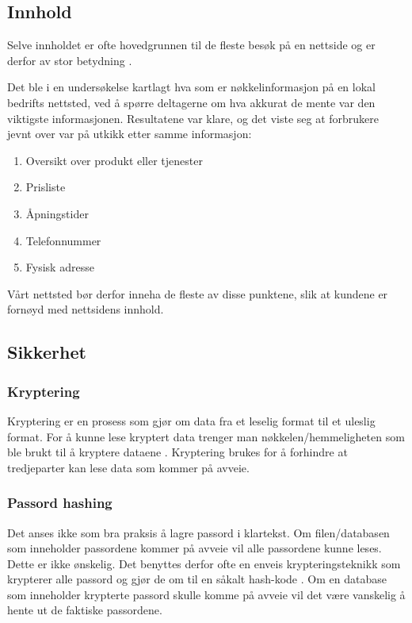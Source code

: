 \subsection{Innhold}
Selve innholdet er ofte hovedgrunnen til de fleste besøk på en nettside og er derfor av stor betydning \cite{thielsch2014ueo}.

Det ble i en undersøkelse \cite{marchant18wdc} kartlagt hva som er nøkkelinformasjon på en lokal bedrifts nettsted, ved å spørre deltagerne om hva akkurat de mente var den viktigste informasjonen. Resultatene var klare, og det viste seg at forbrukere jevnt over var på utkikk etter samme informasjon:
\begin{enumerate}
\item Oversikt over produkt eller tjenester
\item Prisliste
\item Åpningstider
\item Telefonnummer
\item Fysisk adresse
\end{enumerate}

Vårt nettsted bør derfor inneha de fleste av disse punktene, slik at kundene er fornøyd med nettsidens innhold.

\subsection{Sikkerhet}
\label{sec:analysis-security}
 
\subsubsection{Kryptering}
\label{sec:analysis-security-encryption}
Kryptering er en prosess som gjør om data fra et leselig format til et uleslig format. For å kunne lese kryptert data trenger man nøkkelen/hemmeligheten som ble brukt til å kryptere dataene \cite[s.~117-118]{NattTomHeine2015Datasikkerhet}. Kryptering brukes for å forhindre at tredjeparter kan lese data som kommer på avveie.
 
\subsubsection{Passord hashing}
\label{sec:analysis-security-password-hashing}
Det anses ikke som bra praksis å lagre passord i klartekst. Om filen/databasen som inneholder passordene kommer på avveie vil alle passordene kunne leses. Dette er ikke ønskelig. Det benyttes derfor ofte en enveis krypteringsteknikk som krypterer alle passord og gjør de om til en såkalt hash-kode \cite[s.~100-103]{NattTomHeine2015Datasikkerhet}. Om en database som inneholder krypterte passord skulle komme på avveie vil det være vanskelig å hente ut de faktiske passordene.
 
